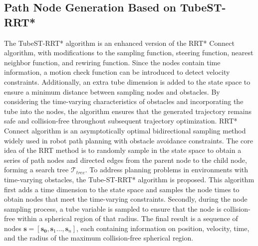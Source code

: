 \documentclass[conference]{IEEEtran}
\begin{document}
    \subsection{Path Node Generation Based on TubeST-RRT*}
    The TubeST-RRT* algorithm is an enhanced version of the RRT* Connect algorithm, with modifications to the sampling function, steering function, nearest neighbor function, and rewiring function. Since the nodes contain time information, a motion check function can be introduced to detect velocity constraints. Additionally, an extra tube dimension is added to the state space to ensure a minimum distance between sampling nodes and obstacles. By considering the time-varying characteristics of obstacles and incorporating the tube into the nodes, the algorithm ensures that the generated trajectory remains safe and collision-free throughout subsequent trajectory optimization.
    RRT* Connect algorithm is an asymptotically optimal bidirectional sampling method widely used in robot path planning with obstacle avoidance constraints. The core idea of the RRT method is to randomly sample in the state space to obtain a series of path nodes and directed edges from the parent node to the child node, forming a search tree $\mathcal{T}_{tree }$. To address planning problems in environments with time-varying obstacles, the Tube-ST-RRT* algorithm is proposed. This algorithm first adds a time dimension to the state space and samples the node times to obtain nodes that meet the time-varying constraints. Secondly, during the node sampling process, a tube variable is sampled to ensure that the node is collision-free within a spherical region of that radius. The final result is a sequence of nodes $\boldsymbol{s} = [\boldsymbol{s_{0}},\boldsymbol{s}_{1}\dots{},\boldsymbol{s}_{n}]$, each containing information on position, velocity, time, and the radius of the maximum collision-free spherical region.
\end{document}
